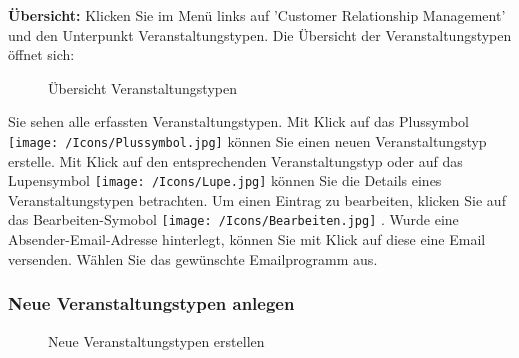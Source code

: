 \textbf{Übersicht:} Klicken Sie im Menü links auf 'Customer Relationship Management' und den Unterpunkt Veranstaltungstypen. Die Übersicht der Veranstaltungstypen öffnet sich:

\begin{figure}[H]
\caption{Übersicht Veranstaltungstypen}
\end{figure}

Sie sehen alle erfassten Veranstaltungstypen. Mit Klick auf das Plussymbol \texttt{[image: /Icons/Plussymbol.jpg]}  können Sie einen neuen Veranstaltungstyp erstelle. Mit Klick auf den entsprechenden Veranstaltungstyp  oder auf das Lupensymbol \texttt{[image: /Icons/Lupe.jpg]}  können Sie die Details eines Veranstaltungstypen betrachten. Um einen Eintrag zu bearbeiten, klicken Sie auf das Bearbeiten-Symobol \texttt{[image: /Icons/Bearbeiten.jpg]} . Wurde eine Absender-Email-Adresse hinterlegt, können Sie mit Klick auf diese  eine Email versenden. Wählen Sie das gewünschte Emailprogramm aus.

\subsubsection{Neue Veranstaltungstypen anlegen}

\begin{figure}[H]
\caption{Neue Veranstaltungstypen erstellen}
\end{figure}

